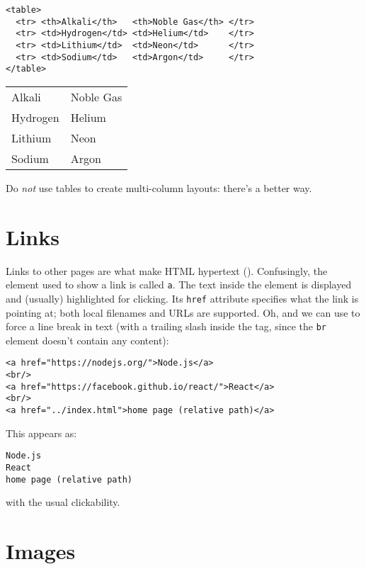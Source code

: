 \begin{verbatim}
<table>
  <tr> <th>Alkali</th>   <th>Noble Gas</th> </tr>
  <tr> <td>Hydrogen</td> <td>Helium</td>    </tr>
  <tr> <td>Lithium</td>  <td>Neon</td>      </tr>
  <tr> <td>Sodium</td>   <td>Argon</td>     </tr>
</table>
\end{verbatim}

\begin{longtable}{ll}
Alkali & Noble Gas \\
Hydrogen & Helium \\
Lithium & Neon \\
Sodium & Argon \\
\end{longtable}

\noindent
Do \emph{not} use tables to create multi-column layouts:
there's a better way.

\section{Links}\label{s:htmlcss-links}

Links to other pages are what make HTML hypertext ().
Confusingly,
the element used to show a link is called \texttt{a}.
The text inside the element is displayed and (usually) highlighted for clicking.
Its \texttt{href} attribute specifies what the link is pointing at;
both local filenames and URLs are supported.
Oh,
and we can use \texttt{} to force a line break in text
(with a trailing slash inside the tag, since the \texttt{br} element doesn't contain any content):

\begin{verbatim}
<a href="https://nodejs.org/">Node.js</a>
<br/>
<a href="https://facebook.github.io/react/">React</a>
<br/>
<a href="../index.html">home page (relative path)</a>
\end{verbatim}

\noindent
This appears as:

\begin{verbatim}
Node.js
React
home page (relative path)
\end{verbatim}

\noindent
with the usual clickability.


\section{Images}\label{s:htmlcss-images}

